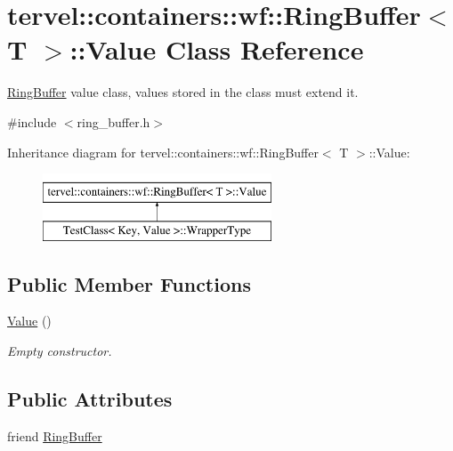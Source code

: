 \hypertarget{classtervel_1_1containers_1_1wf_1_1_ring_buffer_1_1_value}{}\section{tervel\+:\+:containers\+:\+:wf\+:\+:Ring\+Buffer$<$ T $>$\+:\+:Value Class Reference}
\label{classtervel_1_1containers_1_1wf_1_1_ring_buffer_1_1_value}


\hyperlink{classtervel_1_1containers_1_1wf_1_1_ring_buffer}{Ring\+Buffer} value class, values stored in the class must extend it.  




{\ttfamily \#include $<$ring\+\_\+buffer.\+h$>$}

Inheritance diagram for tervel\+:\+:containers\+:\+:wf\+:\+:Ring\+Buffer$<$ T $>$\+:\+:Value\+:\begin{figure}[H]
\begin{center}
\leavevmode
\includegraphics[height=2.000000cm]{classtervel_1_1containers_1_1wf_1_1_ring_buffer_1_1_value}
\end{center}
\end{figure}
\subsection*{Public Member Functions}
\begin{DoxyCompactItemize}
\item 
\hyperlink{classtervel_1_1containers_1_1wf_1_1_ring_buffer_1_1_value_a613688460de05951b79f31a3f1482ede}{Value} ()
\begin{DoxyCompactList}\small\item\em Empty constructor. \end{DoxyCompactList}\end{DoxyCompactItemize}
\subsection*{Public Attributes}
\begin{DoxyCompactItemize}
\item 
friend \hyperlink{classtervel_1_1containers_1_1wf_1_1_ring_buffer_1_1_value_a603884ee3e254094da695fa05b796764}{Ring\+Buffer}
\end{DoxyCompactItemize}
